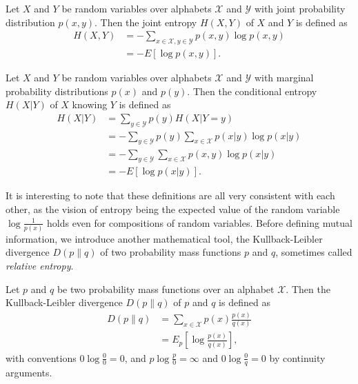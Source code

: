 \begin{appendix_definition}
    Let $X$ and $Y$ be random variables over alphabets $\mathcal{X}$ and $\mathcal{Y}$ with joint probability distribution $p(x, y)$. Then the joint entropy $H(X, Y)$ of $X$ and $Y$ is defined as
    \begin{align}
        H(X, Y) &= - \sum_{x \in \mathcal{X}, y \in \mathcal{Y}} p(x, y) \log p(x, y)\\
                &= - E[\log p(x, y)].
    \end{align}
\end{appendix_definition}

\begin{appendix_definition}
    Let $X$ and $Y$ be random variables over alphabets $\mathcal{X}$ and $\mathcal{Y}$ with marginal probability distributions $p(x)$ and $p(y)$. Then the conditional entropy $H(X|Y)$ of $X$ knowing $Y$ is defined as
    \begin{align}
        H(X|Y) &= \sum_{y \in \mathcal{Y}} p(y) H(X|Y = y)\\
                 &= - \sum_{y \in \mathcal{Y}} p(y) \sum_{x \in \mathcal{X}} p(x|y) \log p(x|y)\\
                 &= - \sum_{y \in \mathcal{Y}} \sum_{x \in \mathcal{X}} p(x, y) \log p(x|y)\\
                 &= - E[\log p(x|y)].
    \end{align}
\end{appendix_definition}

It is interesting to note that these definitions are all very consistent with each other, as the vision of entropy being the expected value of the random variable $\log \frac{1}{p(x)}$ holds even for compositions of random variables. Before defining mutual information, we introduce another mathematical tool, the Kullback-Leibler divergence $D(p \parallel q)$ of two probability mass functions $p$ and $q$, sometimes called \textit{relative entropy}.

\begin{appendix_definition}
    Let $p$ and $q$ be two probability mass functions over an alphabet $\mathcal{X}$. Then the Kullback-Leibler divergence $D(p \parallel q)$ of $p$ and $q$ is defined as
    \begin{align}
        D(p \parallel q) &= \sum_{x \in \mathcal{X}} p(x) \frac{p(x)}{q(x)}\\
                &= E_p\left[\log \frac{p(x)}{q(x)}\right],
    \end{align}
    with conventions $0 \log \frac{0}{0} = 0$, and $p \log \frac{p}{0} = \infty$ and $0 \log \frac{0}{q} = 0$ by continuity arguments.
\end{appendix_definition}

